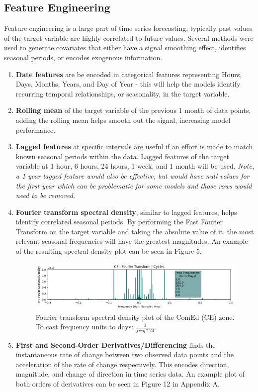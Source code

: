 \documentclass[sigconf]{acmart}
\begin{document}
    \subsection{Feature Engineering}
  Feature engineering is a large part of time series forecasting, typically past values of the target variable are highly correlated to future values. Several methods were used to generate covariates that either have a signal smoothing effect, identifies seasonal periods, or encodes exogenous information.
  \begin{enumerate}
  \item \textbf{Date features} are be encoded in categorical features representing Hours, Days, Months, Years, and Day of Year - this will help the models identify recurring temporal relationships, or seasonality, in the target variable.
  \item \textbf{Rolling mean} of the target variable of the previous 1 month of data points, adding the rolling mean helps smooth out the signal, increasing model performance. 
  \item \textbf{Lagged features} at specific intervals are useful if an effort is made to match known seasonal periods within the data. Lagged features of the target variable at 1 hour, 6 hours, 24 hours, 1 week, and 1 month will be used. \textit{Note, a 1 year lagged feature would also be effective, but would have null values for the first year which can be problematic for some models and those rows would need to be removed.}
  \item \textbf{Fourier transform spectral density}, similar to lagged features, helps identify correlated seasonal periods. By performing the Fast Fourier Transform on the target variable and taking the absolute value of it, the most relevant seasonal frequencies will have the greatest magnitudes. An example of the resulting spectral density plot can be seen in Figure 5.
  
    \begin{figure}[hbt!]
    \includegraphics[width=\linewidth]{Images/FFT.png}
    \caption{Fourier transform spectral density plot of the ComEd (CE) zone. To cast frequency units to days: $\frac{1}{freq*24}$.}
    \Description{}
    \label{fig:fft}
  \end{figure}
  
  \item \textbf{First and Second-Order Derivatives/Differencing} finds the instantaneous rate of change between two observed data points and the acceleration of the rate of change respectively. This encodes direction, magnitude, and change of direction in time series data. An example plot of both orders of derivatives can be seen in Figure 12 in Appendix A.
\end{enumerate}
\end{document}
